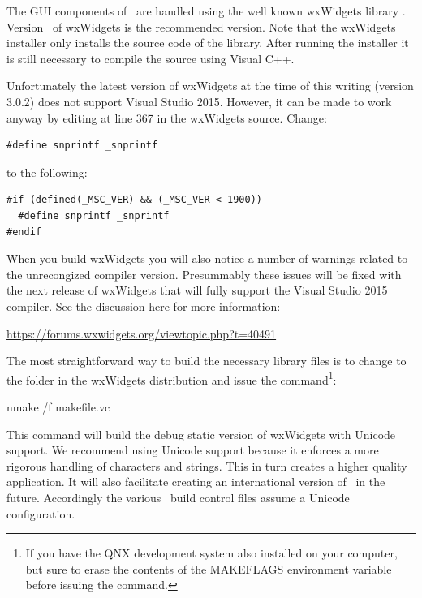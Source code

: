 The GUI components of \MapEditor\ are handled using the well known wxWidgets library
\cite{wxWidgets}. Version \wxWidgetsVersion\ of wxWidgets is the recommended version. Note that
the wxWidgets installer only installs the source code of the library. After running the
installer it is still necessary to compile the source using Visual C++.

Unfortunately the latest version of wxWidgets at the time of this writing (version 3.0.2) does
not support Visual Studio 2015. However, it can be made to work anyway by editing
 at line 367 in the wxWidgets source. Change:

\begin{verbatim}
#define snprintf _snprintf
\end{verbatim}

to the following:

\begin{verbatim}
#if (defined(_MSC_VER) && (_MSC_VER < 1900))
  #define snprintf _snprintf
#endif
\end{verbatim}

When you build wxWidgets you will also notice a number of warnings related to the unrecongized
compiler version. Presummably these issues will be fixed with the next release of wxWidgets that
will fully support the Visual Studio 2015 compiler. See the discussion here for more
information:

\vspace{1.0ex}
\centerline{\url{https://forums.wxwidgets.org/viewtopic.php?t=40491}}

The most straightforward way to build the necessary library files is to change to the
 folder in the wxWidgets distribution and issue the command\footnote{If you
  have the QNX development system also installed on your computer, but sure to erase the
  contents of the MAKEFLAGS environment variable before issuing the  command.}:

\begin{commands}
nmake /f makefile.vc
\end{commands}

This command will build the debug static version of wxWidgets with Unicode support. We recommend
using Unicode support because it enforces a more rigorous handling of characters and strings.
This in turn creates a higher quality application. It will also facilitate creating an
international version of \MapEditor\ in the future. Accordingly the various \MapEditor\ build
control files assume a Unicode configuration.

